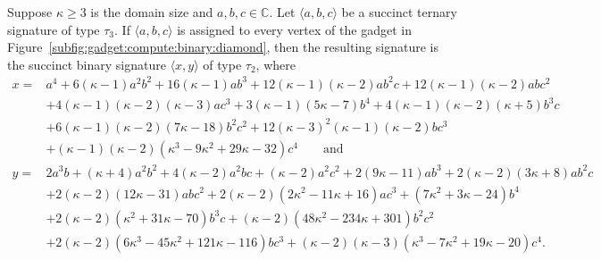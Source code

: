 \documentclass[11pt]{article}
\begin{document}
\begin{lemma} \label{lem:compute:binary:diamond:construction}
 Suppose $\kappa \ge 3$ is the domain size and $a,b,c \in \mathbb{C}$.
 Let $\langle a,b,c \rangle$ be a succinct ternary signature of type $\tau_3$.
 If $\langle a,b,c \rangle$ is assigned to every vertex of the gadget in Figure~\ref{subfig:gadget:compute:binary:diamond},
 then the resulting signature is the succinct binary signature $\langle x,y \rangle$ of type $\tau_2$,
 where
 \begin{align*}
  x = {}&  a^4 + 6 (\kappa - 1) a^2 b^2 + 16 (\kappa - 1) a b^3 + 12 (\kappa - 1) (\kappa - 2) a b^2 c + 12 (\kappa - 1) (\kappa - 2) a b c^2\\
        &+ 4 (\kappa - 1) (\kappa - 2) (\kappa - 3) a c^3 + 3 (\kappa - 1) (5 \kappa - 7) b^4 + 4 (\kappa - 1) (\kappa - 2) (\kappa+5) b^3 c\\
        &+ 6 (\kappa - 1) (\kappa - 2) (7 \kappa - 18) b^2 c^2 + 12 (\kappa - 3)^2 (\kappa - 1) (\kappa - 2) b c^3\\
        &+ (\kappa - 1) (\kappa - 2) (\kappa^3 - 9 \kappa^2 + 29 \kappa - 32) c^4
        \qquad \text{and}\\
  y = {}&  2 a^3 b + (\kappa + 4) a^2 b^2 + 4 (\kappa - 2) a^2 b c + (\kappa - 2) a^2 c^2 + 2 (9 \kappa - 11) a b^3 + 2 (\kappa - 2) (3 \kappa + 8) a b^2 c\\
        &+ 2 (\kappa - 2) (12 \kappa - 31) a b c^2 + 2 (\kappa - 2) (2 \kappa^2 - 11 \kappa + 16) a c^3 + (7 \kappa^2 + 3 \kappa - 24) b^4\\
        &+ 2 (\kappa - 2) (\kappa^2 + 31 \kappa - 70) b^3 c + (\kappa - 2) (48 \kappa^2 - 234 \kappa + 301) b^2 c^2\\
        &+ 2 (\kappa - 2) (6 \kappa^3 - 45 \kappa^2 + 121 \kappa - 116) b c^3 + (\kappa - 2) (\kappa - 3) (\kappa^3 - 7 \kappa^2 + 19 \kappa - 20) c^4.
 \end{align*}
\end{lemma}
\end{document}
